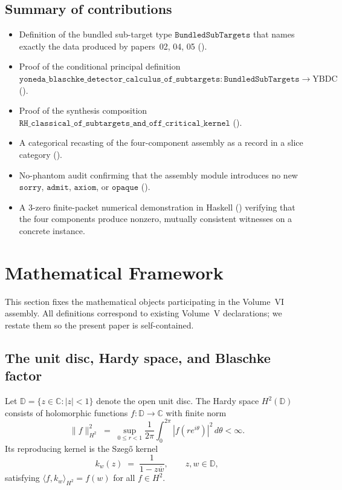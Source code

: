 \documentclass[12pt]{article}
\theoremstyle{plain}
\theoremstyle{definition}
\theoremstyle{remark}
\newcommand{\C}{\mathbb{C}}
\newcommand{\D}{\mathbb{D}}
\newcommand{\HardyTwo}{H^{2}}
\newcommand{\YBDC}{\mathrm{YBDC}}
\begin{document}
\subsection{Summary of contributions}

\begin{itemize}
  \item Definition of the bundled sub-target type
        \(\mathtt{BundledSubTargets}\) that names exactly the data
        produced by papers~02, 04, 05 ().
  \item Proof of the conditional principal definition
        \(\mathtt{yoneda\_blaschke\_detector\_calculus\_of\_subtargets}
        : \mathtt{BundledSubTargets} \to \YBDC\)
        ().
  \item Proof of the synthesis composition
        \(\mathtt{RH\_classical\_of\_subtargets\_and\_off\_critical\_kernel}\)
        ().
  \item A categorical recasting of the four-component assembly as a
        record in a slice category
        ().
  \item No-phantom audit confirming that the assembly module introduces
        no new \(\mathtt{sorry}\), \(\mathtt{admit}\),
        \(\mathtt{axiom}\), or \(\mathtt{opaque}\)
        ().
  \item A 3-zero finite-packet numerical demonstration in Haskell
        () verifying that the four components produce
        nonzero, mutually consistent witnesses on a concrete instance.
\end{itemize}

\section{Mathematical Framework}
\label{sec:mathematical-framework}

This section fixes the mathematical objects participating in the
Volume~VI assembly. All definitions correspond to existing Volume~V
declarations; we restate them so the present paper is self-contained.

\subsection{The unit disc, Hardy space, and Blaschke factor}

Let \(\D = \{ z \in \C : |z| < 1\}\) denote the open unit disc. The
Hardy space \(\HardyTwo(\D)\) consists of holomorphic functions
\(f : \D \to \C\) with finite norm
\[
  \|f\|_{\HardyTwo}^{2}
  \;=\; \sup_{0 \le r < 1} \frac{1}{2\pi} \int_{0}^{2\pi}
        |f(re^{i\theta})|^{2}\,d\theta < \infty.
\]
Its reproducing kernel is the Szegő kernel
\[
  k_{w}(z) \;=\; \frac{1}{1 - z\overline{w}}, \qquad z, w \in \D,
\]
satisfying \(\langle f, k_{w}\rangle_{\HardyTwo} = f(w)\) for all
\(f \in \HardyTwo\).
\end{document}
